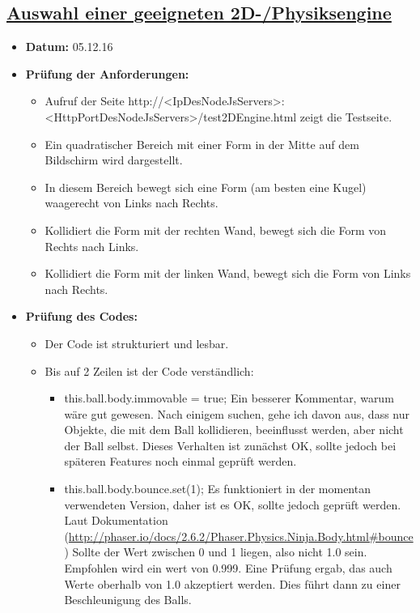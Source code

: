 \subsection{\href{https://github.com/Transport-Protocol/MBC-Ping-Pong/issues/3}{Auswahl einer geeigneten 2D-/Physiksengine}}
\begin{itemize}
	\item \textbf{Datum:} 05.12.16 
	\item \textbf{Prüfung der Anforderungen:}
	\begin{itemize}
		\item \checkmark Aufruf der Seite http://<IpDesNodeJsServers>:<HttpPortDesNodeJsServers>/test2DEngine.html zeigt die Testseite.
		\item \checkmark Ein quadratischer Bereich mit einer Form in der Mitte auf dem Bildschirm wird dargestellt.
		\item \checkmark In diesem Bereich bewegt sich eine Form (am besten eine Kugel) waagerecht von Links nach Rechts.
		\item \checkmark Kollidiert die Form mit der rechten Wand, bewegt sich die Form von Rechts nach Links.
		\item \checkmark Kollidiert die Form mit der linken Wand, bewegt sich die Form von Links nach Rechts.
	\end{itemize}
	\item \textbf{Prüfung des Codes:}
	\begin{itemize}
		\item Der Code ist strukturiert und lesbar.
		\item Bis auf 2 Zeilen ist der Code verständlich: 
		\begin{itemize}
			\item this.ball.body.immovable = true; \newline
			Ein besserer Kommentar, warum wäre gut gewesen. Nach einigem suchen, gehe ich davon aus, dass nur Objekte, die mit dem Ball kollidieren, beeinflusst werden, aber nicht der Ball selbst.\newline
			Dieses Verhalten ist zunächst OK, sollte jedoch bei späteren Features noch einmal geprüft werden.
			\item this.ball.body.bounce.set(1); \newline
			Es funktioniert in der momentan verwendeten Version, daher ist es OK, sollte jedoch geprüft werden. Laut Dokumentation (\href{http://phaser.io/docs/2.6.2/Phaser.Physics.Ninja.Body.html\#bounce}{http://phaser.io/docs/2.6.2/Phaser.Physics.Ninja.Body.html\#bounce}) Sollte der Wert zwischen 0 und 1 liegen, also nicht 1.0 sein. Empfohlen wird ein wert von 0.999. Eine Prüfung ergab, das auch Werte oberhalb von 1.0 akzeptiert werden. Dies führt dann zu einer Beschleunigung des Balls.
		\end{itemize}
	\end{itemize}
\end{itemize}
